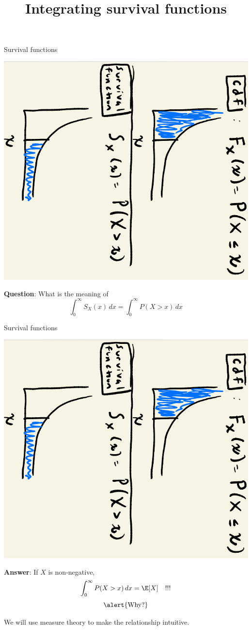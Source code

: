 \documentclass[10pt]{beamer}
\title{Integrating survival functions}
\begin{document}
\maketitle

\begin{frame}{Survival functions}
\begin{center}
\includegraphics[width=.5\textwidth, angle=90]{images/cdf_and_survival_function}
\end{center}
\pause 
\vfill 
\textbf{Question}: What is the meaning of
\[ \int_0^\infty S_X(x) \, dx = \int_{0}^\infty P(X >x) \, dx\]  
\end{frame}


\begin{frame}{Survival functions}
\begin{center}
\includegraphics[width=.5\textwidth, angle=90]{images/cdf_and_survival_function}
\end{center}
\vfill 
\textbf{Answer}: If $X$ is non-negative,
\[ \int_{0}^\infty P(X >x) \, dx = \E[X] \quad !!! \] 
\[ \text{\alert{Why?}} \]
\end{frame}

\begin{frame}[standout]
We will use measure theory to make the relationship intuitive.
\end{frame}
\end{document}
